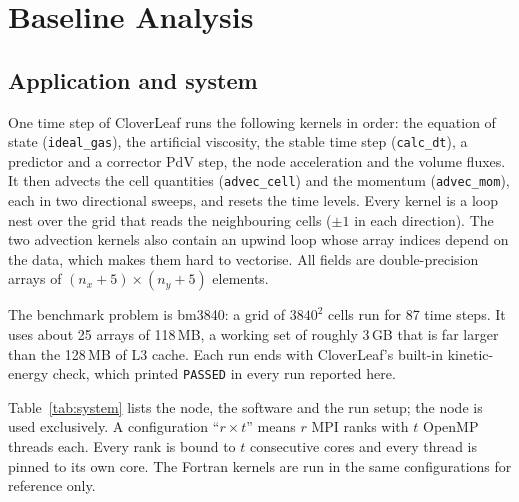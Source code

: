 \documentclass[a4paper,11pt]{article}
\newcommand{\kernel}[1]{\texttt{#1}}
\begin{document}
\section{Baseline Analysis}
\label{sec:base}
\subsection{Application and system}
One time step of CloverLeaf runs the following kernels in order: the equation of state
(\kernel{ideal\_gas}), the artificial viscosity, the stable time step (\kernel{calc\_dt}), a predictor and a
corrector PdV step, the node acceleration and the volume fluxes. It then advects the cell quantities
(\kernel{advec\_cell}) and the momentum (\kernel{advec\_mom}), each in two directional sweeps, and resets the
time levels. Every kernel is a loop nest over the grid that reads the neighbouring cells ($\pm1$ in each
direction). The two advection kernels also contain an upwind loop whose array indices depend on the data,
which makes them hard to vectorise. All fields are double-precision arrays of $(n_x+5)\times(n_y+5)$ elements.

The benchmark problem is bm3840: a grid of $3840^2$ cells run for 87 time steps. It uses about 25 arrays of
118\,MB, a working set of roughly 3\,GB that is far larger than the 128\,MB of L3 cache. Each run ends with
CloverLeaf's built-in kinetic-energy check, which printed \texttt{PASSED} in every run reported here.

Table~\ref{tab:system} lists the node, the software and the run setup; the node is used exclusively.
A configuration ``$r\times t$'' means $r$ MPI ranks with $t$ OpenMP threads each. Every rank is bound to $t$
consecutive cores and every thread is pinned to its own core. The Fortran kernels are run in the same
configurations for reference only.
\end{document}
